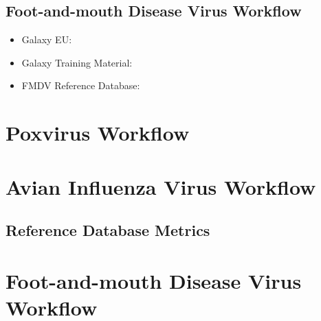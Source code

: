 % 
\subsection*{\thesubsection \quad Foot-and-mouth Disease Virus Workflow}\label{sec:apx-fmdv-links}
\begin{itemize}
	\setlength{\itemsep}{-0.4cm}
	\item Galaxy EU: \texttt{\todoit}
	\item Galaxy Training Material: \texttt{\todoit}
	\item FMDV Reference Database: \texttt{\todoit}
\end{itemize}

% 
\section*{\thesection \quad Poxvirus Workflow}\label{sec:apx-pox-wf}
\todoit

% 
\section*{\thesection \quad Avian Influenza Virus Workflow}\label{sec:apx-aiv-wf}
\todoit

%
\subsection*{\thesubsection \quad Reference Database Metrics}\label{sec:apx-aiv-refs}

% 
\section*{\thesection \quad Foot-and-mouth Disease Virus Workflow}\label{sec:apx-fmdv-wf}
\todoit

